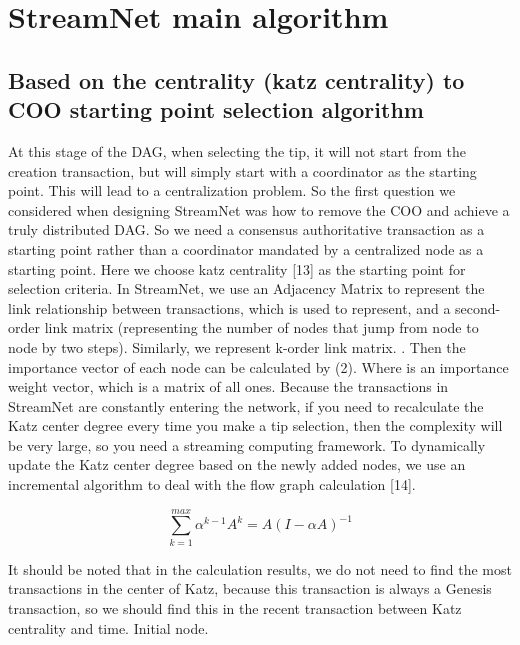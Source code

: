 \section{StreamNet main algorithm}
\subsection{Based on the centrality (katz centrality) to COO starting point selection algorithm}
At this stage of the DAG, when selecting the tip, it will not start from the creation transaction, but will simply start with a coordinator as the starting point. This will lead to a centralization problem. So the first question we considered when designing StreamNet was how to remove the COO and achieve a truly distributed DAG. So we need a consensus authoritative transaction as a starting point rather than a coordinator mandated by a centralized node as a starting point. Here we choose katz centrality [13] as the starting point for selection criteria. In StreamNet, we use an Adjacency Matrix to represent the link relationship between transactions, which is used to represent, and a second-order link matrix (representing the number of nodes that jump from node to node by two steps). Similarly, we represent k-order link matrix. . Then the importance vector of each node can be calculated by (2). Where is an importance weight vector, which is a matrix of all ones. Because the transactions in StreamNet are constantly entering the network, if you need to recalculate the Katz center degree every time you make a tip selection, then the complexity will be very large, so you need a streaming computing framework. To dynamically update the Katz center degree based on the newly added nodes, we use an incremental algorithm to deal with the flow graph calculation [14].

\begin{equation}
\label{simple_equation}
\sum_{k=1}^{max} \alpha^{k-1}A^{k}=A(I-\alpha A)^{-1}
\end{equation}

It should be noted that in the calculation results, we do not need to find the most transactions in the center of Katz, because this transaction is always a Genesis transaction, so we should find this in the recent transaction between Katz centrality and time. Initial node.

